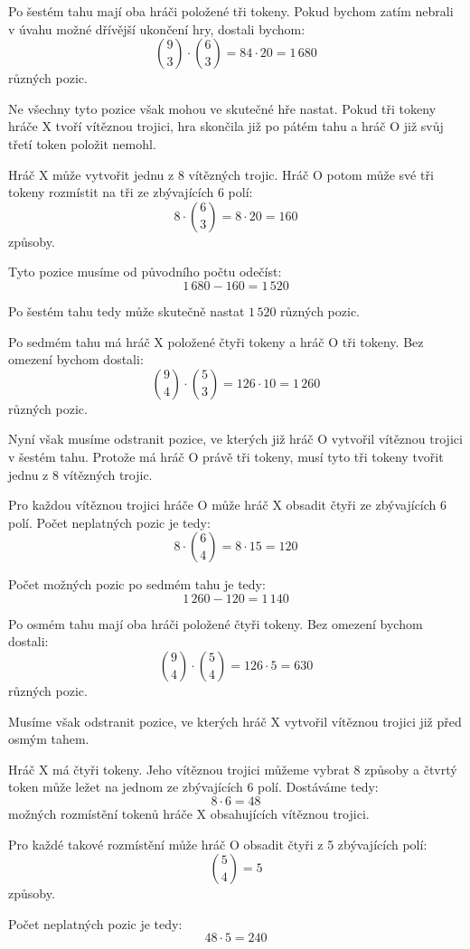 \documentclass[12pt,a4paper]{article}
\begin{document}
Po šestém tahu mají oba hráči položené tři tokeny. 
Pokud bychom zatím nebrali v úvahu možné dřívější ukončení hry, 
dostali bychom:
\[
    \binom{9}{3}\cdot\binom{6}{3}=84\cdot20=1\,680
\]
různých pozic.

Ne všechny tyto pozice však mohou ve skutečné hře nastat. 
Pokud tři tokeny hráče $\mathrm{X}$ tvoří vítěznou trojici, 
hra skončila již po pátém tahu a hráč $\mathrm{O}$ již svůj třetí token položit nemohl.

Hráč $\mathrm{X}$ může vytvořit jednu z 8 vítězných trojic. 
Hráč $\mathrm{O}$ potom může své tři tokeny rozmístit na tři ze zbývajících 6 polí:
\[
    8\cdot\binom{6}{3}=8\cdot20=160
\]
způsoby.

Tyto pozice musíme od původního počtu odečíst:
\[
    1\,680-160=1\,520
\]

Po šestém tahu tedy může skutečně nastat $1\,520$ různých pozic.

Po sedmém tahu má hráč $\mathrm{X}$ položené čtyři tokeny a hráč $\mathrm{O}$ tři tokeny. 
Bez omezení bychom dostali:
\[
    \binom{9}{4}\cdot\binom{5}{3}=126\cdot10=1\,260
\]
různých pozic.

Nyní však musíme odstranit pozice, 
ve kterých již hráč $\mathrm{O}$ vytvořil vítěznou trojici v šestém tahu. 
Protože má hráč $\mathrm{O}$ právě tři tokeny, 
musí tyto tři tokeny tvořit jednu z 8 vítězných trojic.

Pro každou vítěznou trojici hráče $\mathrm{O}$ může hráč $\mathrm{X}$ obsadit 
čtyři ze zbývajících 6 polí. Počet neplatných pozic je tedy:
\[
    8\cdot\binom{6}{4}=8\cdot15=120
\]

Počet možných pozic po sedmém tahu je tedy:
\[
    1\,260-120=1\,140
\]

Po osmém tahu mají oba hráči položené čtyři tokeny. 
Bez omezení bychom dostali:
\[
    \binom{9}{4}\cdot\binom{5}{4}=126\cdot5=630
\]
různých pozic.

Musíme však odstranit pozice, ve kterých hráč $\mathrm{X}$ vytvořil vítěznou trojici 
již před osmým tahem.

Hráč $\mathrm{X}$ má čtyři tokeny. 
Jeho vítěznou trojici můžeme vybrat 8 způsoby 
a čtvrtý token může ležet na jednom ze zbývajících 6 polí. 
Dostáváme tedy:
\[
    8\cdot6=48
\]
možných rozmístění tokenů hráče $\mathrm{X}$ obsahujících vítěznou trojici.

Pro každé takové rozmístění může hráč $\mathrm{O}$ obsadit čtyři z 5 zbývajících polí:
\[
    \binom{5}{4}=5
\]
způsoby.

Počet neplatných pozic je tedy:
\[
    48\cdot5=240
\]
\end{document}
